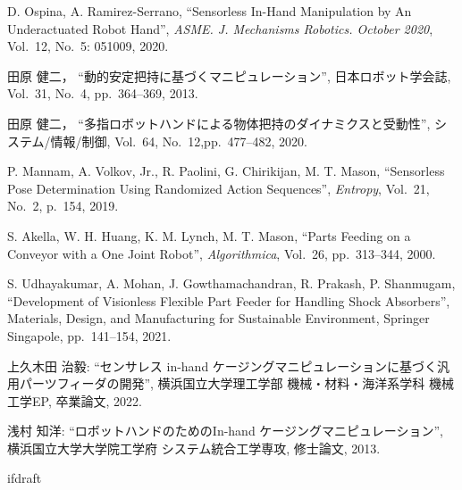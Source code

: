 \documentclass[a4paper,twoside,12pt,papersize, dvipdfmx]{iirthesis}
\begin{document}
\begin{thebibliography}{}
	D. Ospina, A. Ramirez-Serrano,
  	``Sensorless In-Hand Manipulation by An Underactuated Robot Hand'',
  	 {\it ASME. J. Mechanisms Robotics. October 2020},
  	 Vol.~12, No.~5: 051009, 
  	2020.

	田原 健二，
  	``動的安定把持に基づくマニピュレーション'',
  	 日本ロボット学会誌,
  	 Vol.~31, No.~4, pp.~364--369,
  	2013.  	

    	田原 健二，
  	``多指ロボットハンドによる物体把持のダイナミクスと受動性'',
  	 システム/情報/制御,
  	 Vol.~64, No.~12,pp.~477--482,
  	2020. 
  	
  	P. Mannam, A. Volkov, Jr., R. Paolini, G. Chirikijan, M. T. Mason,
  	``Sensorless Pose Determination Using Randomized Action Sequences'',
  	 {\it Entropy}, Vol.~21, No.~2, p.~154, 
  	2019.
  	
  	S. Akella, W. H. Huang, K. M. Lynch, M. T. Mason,
  	``Parts Feeding on a Conveyor with a One Joint Robot'',
  	 {\it Algorithmica},
  	 Vol.~26,
  	 pp.~313--344,
  	2000.
  	
  	S. Udhayakumar, A. Mohan, J. Gowthamachandran,  R. Prakash, P. Shanmugam,
  	``Development of Visionless Flexible Part Feeder for Handling Shock Absorbers'',
  	 Materials, Design, and Manufacturing for Sustainable Environment, Springer Singapole, 
  	 pp.~141--154,
  	2021.  	
  	
上久木田 治毅:
``センサレス in-hand ケージングマニピュレーションに基づく汎用パーツフィーダの開発'', 
横浜国立大学理工学部 機械・材料・海洋系学科 機械工学EP, 卒業論文, 2022.
  	
浅村 知洋:
``ロボットハンドのためのIn-hand ケージングマニピュレーション'', 
横浜国立大学大学院工学府 システム統合工学専攻, 修士論文, 2013.
\end{thebibliography}

\expandafter\ifx\csname ifdraft\endcsname\relax
    
\end{document}
